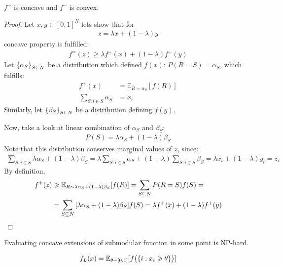 \begin{prop}
	$f^+$ is concave and $f^-$ is convex.
	\begin{proof}
		Let $x,y\in [0,1]^N$ lets show that for
		\begin{align}
			z = \lambda x + (1-\lambda)y
		\end{align}
		concave property is fulfilled:
		\begin{align}
		f^=(z) \geqslant \lambda f^+(x) +  (1-\lambda)f^+(y) 
		\end{align}
		Let $\qty{\alpha_S}_{S\subseteq N}$ be a distribution which defined $f(x)$: $P(R = S) = \alpha_S$, which fulfills:
		\begin{align}
		f^+(x) &= \mathbb{E}_{R\sim \alpha_S} [f(R)] \\
		\sum_{S: i\in S} \alpha_S &= x_i
		\end{align}
		Similarly, let $\qty{\beta_S}_{S\subseteq N}$ be a distribution defining $f(y)$.
		
		Now, take a look at linear combination of $\alpha_S$ and $\beta_S$:
		\begin{align}
		P(S) = \lambda\alpha_S + (1-\lambda)\beta_S
		\end{align}
		Note that this distribution conserves marginal values of $z$, since:
		\begin{align}
		\sum_{S: i\in S} \lambda \alpha_S + (1-\lambda) \beta_S = \lambda \sum_{S: i\in S} \alpha_S + (1-\lambda) \sum_{S: i\in S}\beta_S = \lambda x_i + (1-\lambda) y_i = z_i
		\end{align} 
		By definition,
		\begin{align}
		f^+(z) &\geqslant  \mathbb{E}_{R\sim\lambda \alpha_S + (1-\lambda) \beta_S} [f(R)] = \sum_{S \subseteq N} P(R=S) f(S) =\\&= \sum_{S \subseteq N} \qty[\lambda \alpha_S + (1-\lambda) \beta_S]f(S) = \lambda f^+(x) + (1-\lambda) f^+(y)
		\end{align}
	\end{proof}
\end{prop}

\begin{prop}
	Evaluating concave extensions of submodular function in some point is NP-hard.
\end{prop}

\begin{definition}
	\begin{align}
	f_L(x) = \mathbb{E}_{\theta \sim [0,1]} [f\qty\big(\qty{i: x_i \geqslant \theta})]
	\end{align}
\end{definition}

